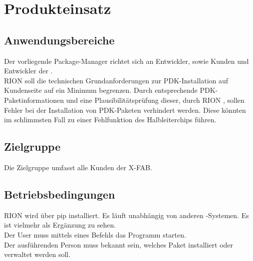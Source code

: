 \chapter{Produkteinsatz}

\section{Anwendungsbereiche}
Der vorliegende Package-Manager richtet sich an Entwickler, sowie Kunden und Entwickler der \x. \\
RION soll die technischen Grundanforderungen zur PDK-Installation auf Kundenseite auf ein Minimum begrenzen. Durch entsprechende PDK-Paketinformationen und eine Plausibilitätsprüfung dieser, durch RION , sollen Fehler bei der Installation von PDK-Paketen verhindert werden. Diese könnten im schlimmsten Fall zu einer Fehlfunktion des Halbleiterchips führen.
\section{Zielgruppe}
Die Zielgruppe umfasst alle Kunden der X-FAB.


\section{Betriebsbedingungen}
RION wird über pip installiert. Es läuft unabhängig von anderen \x-Systemen. Es ist vielmehr als Ergänzung zu sehen.\\
Der User muss mittels eines Befehls das Programm starten.\\
Der ausführenden Person muss bekannt sein, welches Paket installiert oder verwaltet werden soll.

